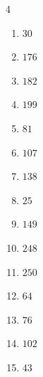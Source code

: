 \begin{multicols}{4}
\begin{enumerate}
  \item $30$


  \item $176$


  \item $182$


  \item $199$


  \item $81$


  \item $107$


\columnbreak %

\resetques

  \item $138$


  \item $25$


  \item $149$


  \item $248$


  \item $250$


  \item $64$


  \item $76$


  \item $102$


  \item $43$



\end{enumerate}
\end{multicols}
